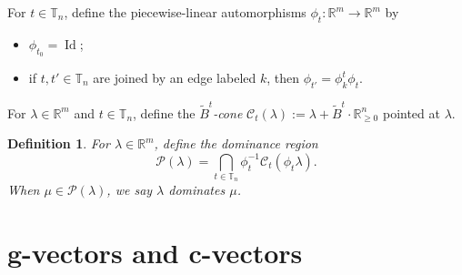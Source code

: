 \documentclass{amsart}
\newtheorem{definition}[theorem]{Definition}
\newtheorem{lemma}[theorem]{Lemma}
\numberwithin{theorem}{section}
\newcommand{\bfc}{\boldsymbol{c}}
\newcommand{\bfg}{\boldsymbol{g}}
\newcommand{\cC}{\mathcal{C}}
\newcommand{\cP}{\mathcal{P}}
\newcommand{\RR}{\mathbb{R}}
\newcommand{\TT}{\mathbb{T}}
\newcommand{\Col}{\operatorname{Col}}
\newcommand{\Id}{\operatorname{Id}}
\begin{document}

  For $t\in\TT_n$, define the piecewise-linear automorphisms $\phi_t:\RR^m\to\RR^m$ by
  \begin{itemize}
    \item $\phi_{t_0}=\Id$;
    \item if $t,t'\in\TT_n$ are joined by an edge labeled $k$, then $\phi_{t'}=\phi^t_k \phi_t$.
  \end{itemize}
  
  For $\lambda\in\RR^m$ and $t\in\TT_n$, define the \emph{$\tilde B^t$-cone} $\cC_t(\lambda):=\lambda+\tilde B^t\cdot\RR_{\ge0}^n$ pointed at $\lambda$.

  \begin{definition}
    For $\lambda\in\RR^m$, define the \emph{dominance region} 
    \[
      \cP(\lambda) = \bigcap_{t\in\TT_n} \phi_t^{-1} \cC_t(\phi_t \lambda).
    \]
    When $\mu\in\cP(\lambda)$, we say \emph{$\lambda$ dominates $\mu$}.
  \end{definition}


  \section{$\bfg$-vectors and $\bfc$-vectors}
\end{document}
